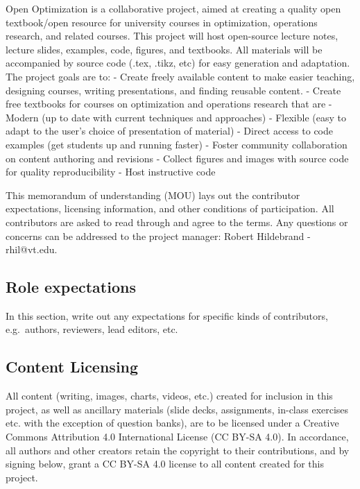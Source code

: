 Open Optimization is a collaborative project, aimed at creating a
quality open textbook/open resource for university courses in
optimization, operations research, and related courses. This project
will host open-source lecture notes, lecture slides, examples, code,
figures, and textbooks. All materials will be accompanied by source code
(.tex, .tikz, etc) for easy generation and adaptation. The project goals
are to: - Create freely available content to make easier teaching,
designing courses, writing presentations, and finding reusable content.
- Create free textbooks for courses on optimization and operations
research that are - Modern (up to date with current techniques and
approaches) - Flexible (easy to adapt to the user's choice of
presentation of material) - Direct access to code examples (get students
up and running faster) - Foster community collaboration on content
authoring and revisions - Collect figures and images with source code
for quality reproducibility - Host instructive code

This memorandum of understanding (MOU) lays out the contributor
expectations, licensing information, and other conditions of
participation. All contributors are asked to read through and agree to
the terms. Any questions or concerns can be addressed to the project
manager: Robert Hildebrand - rhil@vt.edu.

\hypertarget{role-expectations}{%
\subsection{Role expectations}\label{role-expectations}}

In this section, write out any expectations for specific kinds of
contributors, e.g.~authors, reviewers, lead editors, etc.

\hypertarget{content-licensing}{%
\subsection{Content Licensing}\label{content-licensing}}

All content (writing, images, charts, videos, etc.) created for
inclusion in this project, as well as ancillary materials (slide decks,
assignments, in-class exercises etc. with the exception of question
banks), are to be licensed under a Creative Commons Attribution 4.0
International License (CC BY-SA 4.0). In accordance, all authors and
other creators retain the copyright to their contributions, and by
signing below, grant a CC BY-SA 4.0 license to all content created for
this project.

